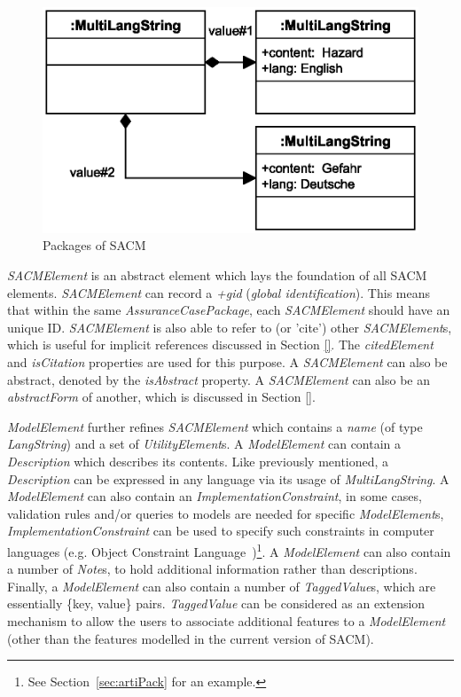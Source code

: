 \begin{figure}
	\centering
	\includegraphics[width=0.5\linewidth]{fig/MultiLangString.eps}
	\caption{Packages of SACM}
	\label{fig:mulitiLang}
\end{figure}

\textit{SACMElement} is an abstract element which lays the foundation of all SACM elements. \textit{SACMElement} can record a \textit{+gid} (\textit{global identification}). 
This means that within the same \textit{AssuranceCasePackage}, each \textit{SACMElement} should have an unique ID. 
\textit{SACMElement} is also able to refer to (or 'cite') other \textit{SACMElement}s, which is useful for implicit references discussed in Section \ref{}. The \textit{citedElement} and \textit{isCitation} properties are used for this purpose. A \textit{SACMElement} can also be abstract, denoted by the \textit{isAbstract} property. A \textit{SACMElement} can also be an \textit{abstractForm} of another, which is discussed in Section \ref{}. 

\textit{ModelElement} further refines \textit{SACMElement} which contains a \textit{name} (of type \textit{LangString}) and a set of \textit{UtilityElement}s. A \textit{ModelElement} can contain a \textit{Description} which describes its contents. Like previously mentioned, a \textit{Description} can be expressed in any language via its usage of \textit{MultiLangString}. A \textit{ModelElement} can also contain an \textit{ImplementationConstraint}, in some cases, validation rules and/or queries to models are needed for specific \textit{ModelElement}s, \textit{ImplementationConstraint} can be used to specify such constraints in computer languages (e.g. Object Constraint Language~\cite{})\footnote{See Section~\ref{sec:artiPack} for an example.}. A \textit{ModelElement} can also contain a number of \textit{Note}s, to hold additional information rather than descriptions. Finally, a \textit{ModelElement} can also contain a number of \textit{TaggedValue}s, which are essentially \{key, value\} pairs. \textit{TaggedValue} can be considered as an extension mechanism to allow the users to associate additional features to a \textit{ModelElement} (other than the features modelled in the current version of SACM).

